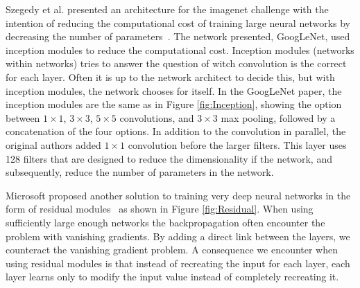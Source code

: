 Szegedy et al. presented an architecture for the imagenet challenge with the intention of reducing the computational cost of training large neural networks by decreasing the number of parameters~\cite{DBLP:journals/corr/SzegedyLJSRAEVR14}. 
The network presented, GoogLeNet, used inception modules to reduce the computational cost.  Inception modules (networks within networks) tries to answer the question of witch convolution is the correct for each layer. Often it is up to the network architect to decide this, but with inception modules, the network chooses for itself. 
In the GoogLeNet paper, the inception modules are the same as in Figure \ref{fig:Inception}, showing the option between $1 \times 1$, $3 \times 3$, $5 \times 5$ convolutions, and $3 \times 3$ max pooling, followed by a concatenation of the four options. In addition to the convolution in parallel, the original authors added $1 \times 1$ convolution before the larger filters. This layer uses 128 filters that are designed to reduce the dimensionality if the network, and subsequently, reduce the number of parameters in the network.


Microsoft proposed another solution to training very deep neural networks in the form of residual modules~\cite{DBLP:journals/corr/HeZRS15} as shown in Figure \ref{fig:Residual}.
When using sufficiently large enough networks the backpropagation often encounter the problem with vanishing gradients. By adding a direct link between the layers, we counteract the vanishing gradient problem. A consequence we encounter when using residual modules is that instead of recreating the input for each layer, each layer learns only to modify the input value instead of completely recreating it.

